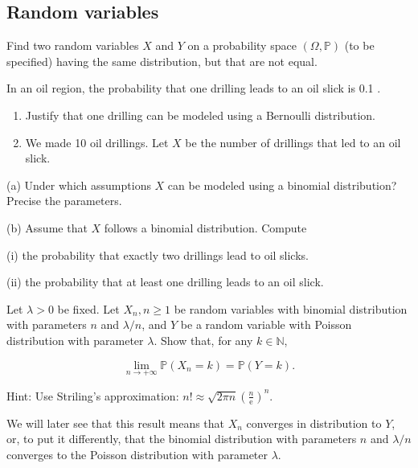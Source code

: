 \begin{center}
    \section*{Random variables}
\end{center}

\begin{Exercise}
    Find two random variables $X$ and $Y$ on a probability space $(\Omega, \mathbb{P})$ (to be specified) having the same distribution, but that are not equal.
\end{Exercise}

\begin{Exercise}
     In an oil region, the probability that one drilling leads to an oil slick is 0.1 .

\begin{enumerate}
  \item Justify that one drilling can be modeled using a Bernoulli distribution.

  \item We made 10 oil drillings. Let $X$ be the number of drillings that led to an oil slick.

\end{enumerate}

(a) Under which assumptions $X$ can be modeled using a binomial distribution? Precise the parameters.

(b) Assume that $X$ follows a binomial distribution. Compute

(i) the probability that exactly two drillings lead to oil slicks.

(ii) the probability that at least one drilling leads to an oil slick.
\end{Exercise}

\begin{Exercise}
     Let $\lambda>0$ be fixed. Let $X_{n}, n \geq 1$ be random variables with binomial distribution with parameters $n$ and $\lambda / n$, and $Y$ be a random variable with Poisson distribution with parameter $\lambda$. Show that, for any $k \in \mathbb{N}$,

$$
\lim _{n \rightarrow+\infty} \mathbb{P}\left(X_{n}=k\right)=\mathbb{P}(Y=k) .
$$

Hint: Use Striling's approximation: $n ! \approx \sqrt{2 \pi n}\left(\frac{n}{\mathrm{e}}\right)^{n}$.

We will later see that this result means that $X_{n}$ converges in distribution to $Y$, or, to put it differently, that the binomial distribution with parameters $n$ and $\lambda / n$ converges to the Poisson distribution with parameter $\lambda$.
\end{Exercise}
